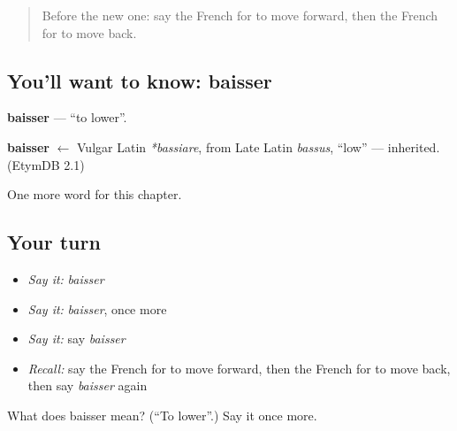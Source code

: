 \begin{quote}
Before the new one: say the French for to move forward, then the French for to move back.
\end{quote}

\subsection*{You'll want to know: baisser}
\textbf{baisser} — \textquotedblleft{}to lower\textquotedblright{}.

\begin{cousinweb}
\textbf{baisser} $\leftarrow$ Vulgar Latin \emph{*bassiare}, from Late Latin \emph{bassus}, \textquotedblleft{}low\textquotedblright{} — inherited. (EtymDB 2.1)
\end{cousinweb}

\begin{grammarlens}[title={What you've built}]
One more word for this chapter.
\end{grammarlens}

\subsection*{Your turn}
\begin{itemize}
\raggedright
  \item \emph{Say it:} \emph{baisser}
  \item \emph{Say it:} \emph{baisser}, once more
  \item \emph{Say it:} say \emph{baisser}
  \item \emph{Recall:} say the French for to move forward, then the French for to move back, then say \emph{baisser} again
\end{itemize}

\begin{tcolorbox}[breakable,colback=teal!4,colframe=teal!35!black,title={Before you move on}]
What does baisser mean? (\textquotedblleft{}To lower\textquotedblright{}.) Say it once more.
\end{tcolorbox}
